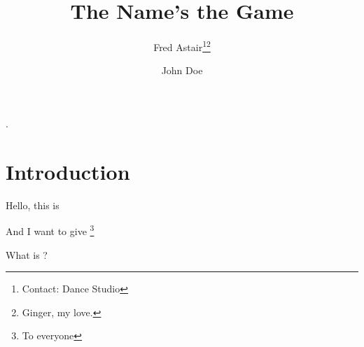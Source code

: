 \documentclass[]{memoir}
\title{The Name's the Game}
\author{Fred Astair\thanks{Contact: Dance Studio}\thanks{Ginger, my love.}}
\newlength{\rulewidth}
\newcommand{\HRule}[1][0.4pt]{%
	\setlength{\rulewidth}{#1}
	\rule{\textwidth}{\rulewidth}%
}
\renewcommand{\maketitlehooka}{%
		\HRule[1.6pt]\vspace*{-\baselineskip}\vspace*{2pt}
		\HRule\\[\baselineskip]
		} %
\renewcommand{\maketitlehookb}{%
		\HRule\vspace*{-\baselineskip}\vspace*{3.2pt}
		\HRule[1.6pt]\\[\baselineskip]%
		} %
\begin{document}
\setheadfoot{\headheight}{1.5\footskip} %
\setlength{\parindent}{0pt}

\begin{titlingpage}
\setlength{\droptitle}{30pt}
\maketitle
\end{titlingpage}

\begin{abstract}
\lipsum[1-2]
\end{abstract}
\newpage

\setlength{\droptitle}{-60pt}
\renewcommand{\maketitlehooka}{}%
\renewcommand{\maketitlehookb}{}%



\begin{titlingpage}
{\let\newpage\relax}
\emptythanks.
\end{titlingpage}
{\let\newpage\relax\maketitle}

\nopagebreak

\section{Introduction}
Hello, this is \author{John Doe} %

And I want to give \thanks{To everyone}

What is \@thanks?
\end{document}
